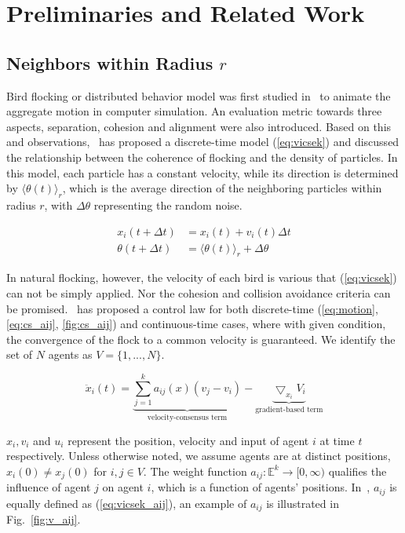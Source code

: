 \chapter{Preliminaries and Related Work}\label{preliminaries}

\section{Neighbors within Radius $r$}\label{flocking}

Bird flocking or distributed behavior model was first studied in~\cite{Reynolds1987} to animate the aggregate motion in computer simulation. An evaluation metric towards three aspects, separation, cohesion and alignment were also introduced. Based on this and observations,~\cite{Vicsek1995} has proposed a discrete-time model (\ref{eq:vicsek}) and discussed the relationship between the coherence of flocking and the density of particles. In this model, each particle has a constant velocity, while its direction is determined by ${\langle\theta(t)\rangle}_r$, which is the average direction of the neighboring particles within radius $r$, with $\Delta\theta$ representing the random noise.

\begin{equation}\label{eq:vicsek}
\begin{aligned}
x_i(t+\Delta t)&=x_i(t)+v_i(t)\Delta t\\
\theta(t+\Delta t)&={\langle\theta(t)\rangle}_r+\Delta\theta
\end{aligned}
\end{equation}

In natural flocking, however, the velocity of each bird is various that (\ref{eq:vicsek}) can not be simply applied. Nor the cohesion and collision avoidance criteria can be promised.~\cite{CuckerSmale2007} has proposed a control law for both discrete-time (\ref{eq:motion}, \ref{eq:cs_aij}, \ref{fig:cs_aij}) and continuous-time cases, where with given condition, the convergence of the flock to a common velocity is guaranteed. We identify the set of $N$ agents as $V=\{1,...,N\}$.

\begin{equation}\label{eq:motion}
\ddot{x}_i(t)=\underbrace{\sum^k_{j=1}a_{ij}(x)(v_j-v_i)}_{\text{velocity-consensus term}}-\underbrace{\bigtriangledown_{x_i}V_i}_{\text{gradient-based term}}
\end{equation}

\noindent
$x_i, v_i$ and $u_i$ represent the position, velocity and input of agent $i$ at time $t$ respectively. Unless otherwise noted, we assume agents are at distinct positions, $x_i(0)\neq x_j(0)$ for $i, j\in V$. The weight function $a_{ij}:\mathbb{E}^k\to[0,\infty)$ qualifies the influence of agent $j$ on agent $i$, which is a function of agents' positions. In~\cite{Vicsek1995}, $a_{ij}$ is equally defined as (\ref{eq:vicsek_aij}), an example of $a_{ij}$ is illustrated in Fig.~\ref{fig:v_aij}.

